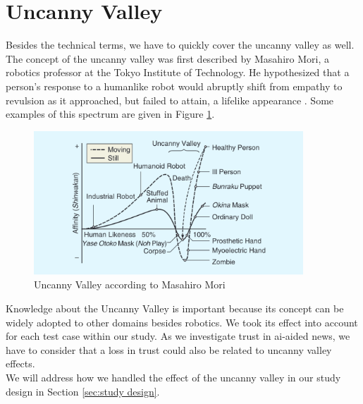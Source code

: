 \documentclass[
  a4paper,  %
  twoside,  %
  bibliography=totoc,
  headsepline,
  cleardoublepage=empty,
  parskip=half,
  draft=false
]{scrbook}
\begin{document}
\section{Uncanny Valley}
Besides the technical terms, we have to quickly cover the uncanny valley as well. The concept of the uncanny valley was first described by Masahiro Mori, a robotics professor at the Tokyo Institute of Technology. He hypothesized that a person's response to a humanlike robot would abruptly shift from empathy to revulsion as it approached, but failed to attain, a lifelike appearance \cite{moriUncannyValleyField2012}. Some examples of this spectrum are given in Figure \ref{fig:uncanny-valley}.

\begin{figure}[h]
  \centering
  \includegraphics[width=0.9\textwidth]{./graphics/uncanny-valley.png}
  \caption{Uncanny Valley according to Masahiro Mori \cite{moriUncannyValleyField2012}}
  \label{fig:uncanny-valley}
\end{figure}

Knowledge about the Uncanny Valley is important because its concept can be widely adopted to other domains besides robotics. We took its effect into account for each test case within our study. As we investigate trust in \gls{ai}-aided news, we have to consider that a loss in trust could also be related to uncanny valley effects. \\
We will address how we handled the effect of the uncanny valley in our study design in Section \ref{sec:study design}.
\end{document}
